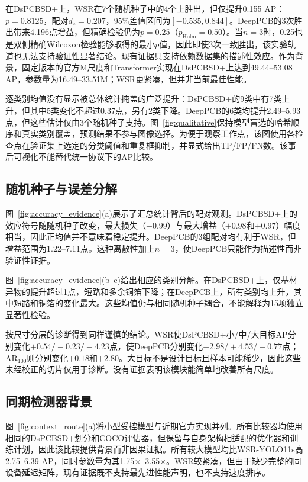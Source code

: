\documentclass[conference]{IEEEtran}
\begin{document}
在DsPCBSD+上，WSR在7个随机种子中的4个上胜出，但仅提升0.155 AP：$p=0.8125$，配对$d_z=0.207$，95\%差值区间为$[-0.535,0.844]$。DeepPCB的3次胜出带来4.196点增益，但精确检验仍为$p=0.25$（$p_{\mathrm{Holm}}=0.50$）。当$n=3$时，0.25也是双侧精确Wilcoxon检验能够取得的最小$p$值，因此即使3次一致胜出，该实验轨道也无法支持验证性显著结论。现有证据只支持依赖数据集的描述性效应。作为背景，固定版本的官方M尺度和Transformer实现在DsPCBSD+上达到49.44--53.08 AP，参数量为16.49--33.51M；WSR更紧凑，但并非当前最佳性能。

逐类别均值没有显示被总体统计掩盖的广泛提升：DsPCBSD+的9类中有7类上升，但其中5类变化不超过0.37点，另有2类下降。DeepPCB的6类均提升2.49--5.93点，但这些估计仅由3个随机种子支持。图~\ref{fig:qualitative}保持模型盲选的哈希顺序和真实类别覆盖，预测结果不参与图像选择。为便于观察工作点，该图使用各检查点在验证集上选定的分类阈值和重复框抑制，并显式给出TP/FP/FN数。该事后可视化不能替代统一协议下的AP比较。

\subsection{随机种子与误差分解}
图~\ref{fig:accuracy_evidence}(a)展示了汇总统计背后的配对观测。DsPCBSD+上的效应符号随随机种子改变，最大损失（$-0.99$）与最大增益（$+0.98$和$+0.97$）幅度相当，因此正均值并不意味着稳定提升。DeepPCB的3组配对均有利于WSR，但增益范围为1.22--7.11点。这种离散性加上$n=3$，使DeepPCB只能作为描述性而非验证性证据。

图~\ref{fig:accuracy_evidence}(b--c)给出相应的类别分解。在DsPCBSD+上，仅基材异物的提升超过1点，短路和多余铜箔下降；在DeepPCB上，所有类别均上升，其中短路和铜箔的变化最大。这些均值仍与相同随机种子耦合，不能解释为15项独立显著性检验。

按尺寸分层的诊断得到同样谨慎的结论。WSR使DsPCBSD+小/中/大目标AP分别变化$+0.54/-0.23/-4.23$点，使DeepPCB分别变化$+2.98/+4.53/-0.77$点；AR$_{100}$则分别变化$+0.18$和$+2.80$。大目标不是设计目标且样本可能稀少，因此这些未经校正的切片仅用于诊断。没有证据表明该模块能简单地改善所有尺度。

\subsection{同期检测器背景}
图~\ref{fig:context_route}(a)将小型受控模型与近期官方实现并列。所有比较器均使用相同的DsPCBSD+划分和COCO评估器，但保留与自身架构相适配的优化器和训练计划，因此该比较提供背景而非因果证据。所有较大模型均比WSR-YOLO11s高2.75--6.39 AP，同时参数量为其1.75$\times$--3.55$\times$。WSR较紧凑，但由于缺少完整的同设备延迟矩阵，现有证据既不支持最先进性能声明，也不支持速度排序。
\end{document}
